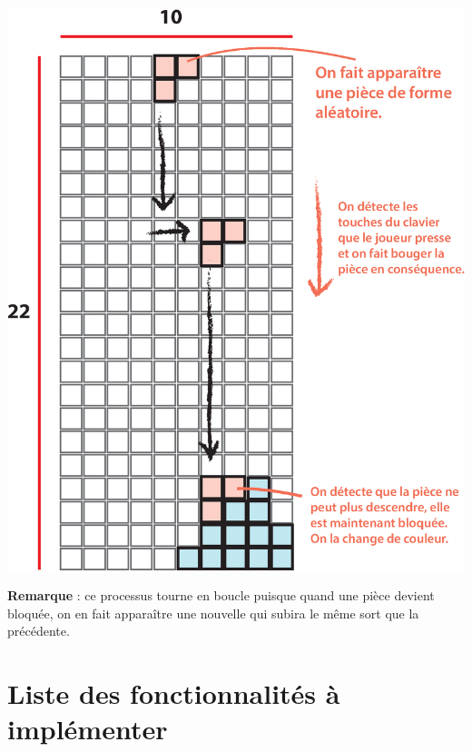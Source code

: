 \documentclass[a4paper]{article}
\begin{document}
\begin{center}
    \includegraphics[scale=0.7]{img/game-explanation.eps} 
\end{center}

\noindent\textbf{Remarque} : ce processus tourne en boucle puisque quand une
pièce devient bloquée, on en fait apparaître une nouvelle qui subira le même
sort que la précédente.

\newpage
\section{Liste des fonctionnalités à implémenter}
\end{document}
